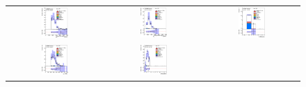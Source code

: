\clearpage
\begin{figure}[htbp]
\begin{center}
\begin{tabular}{ccc}
%
\includegraphics[width=0.30\textwidth]{appendices/figures/sdrs/JetPtB1_ELEMUONCR6_1W_NOMINAL.eps}  &
\includegraphics[width=0.30\textwidth]{appendices/figures/sdrs/JetPtB2_ELEMUONCR6_1W_NOMINAL.eps} &
\includegraphics[width=0.30\textwidth]{appendices/figures/sdrs/nWhad_ELEMUONCR6_1W_NOMINAL_logscale.eps} \\
\includegraphics[width=0.30\textwidth]{appendices/figures/sdrs/VLQAna_WbX_W1Pt_ELEMUONCR6_1W_NOMINAL.eps} &
\includegraphics[width=0.30\textwidth]{appendices/figures/sdrs/VLQAna_WbX_DRLepMet_ELEMUONCR6_1W_NOMINAL.eps} &

\end{tabular}
\end{center}
\end{figure}
